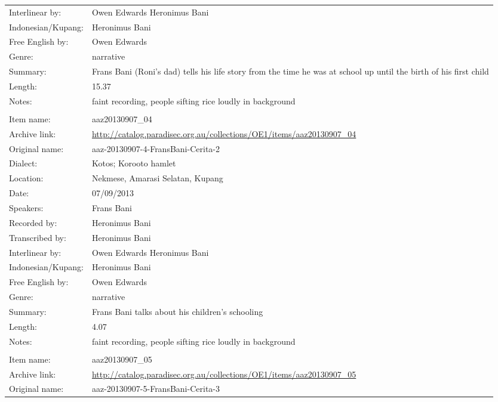 \begin{longtable}{lL{.67\textwidth}}
Interlinear by:		& Owen Edwards Heronimus Bani\\
Indonesian/Kupang:		& Heronimus Bani\\
Free English by:		& Owen Edwards\\
Genre:				& narrative\\
Summary:				& Frans Bani (Roni's dad) tells his life story from the time he was at school up until the birth of his first child\\
Length:				& 15.37\\
Notes:				& faint recording, people sifting rice loudly in background\\ \lspbottomrule
{}			& \\
Item name:			& aaz20130907{\_}04 \\
Archive link:			& \url{http://catalog.paradisec.org.au/collections/OE1/items/aaz20130907_04 }\\
Original name:			& aaz-20130907-4-FransBani-Cerita-2\\
Dialect:				& Kotos; Koro{\Q}oto hamlet \\
Location:				& Nekmese{\Q}, Amarasi Selatan, Kupang \\
Date:				& 07/09/2013\\
Speakers:				& Frans Bani\\
Recorded by:			& Heronimus Bani\\
Transcribed by:		& Heronimus Bani\\
Interlinear by:		& Owen Edwards Heronimus Bani\\
Indonesian/Kupang:		& Heronimus Bani\\
Free English by:		& Owen Edwards\\
Genre:				& narrative\\
Summary:				& Frans Bani talks about his children's schooling\\
Length:				& 4.07\\
Notes:				& faint recording, people sifting rice loudly in background\\ \lspbottomrule
{}			& \\
Item name:			& aaz20130907{\_}05\\
Archive link:			& \url{http://catalog.paradisec.org.au/collections/OE1/items/aaz20130907_05}\\
Original name:			& aaz-20130907-5-FransBani-Cerita-3\\

\end{longtable}
